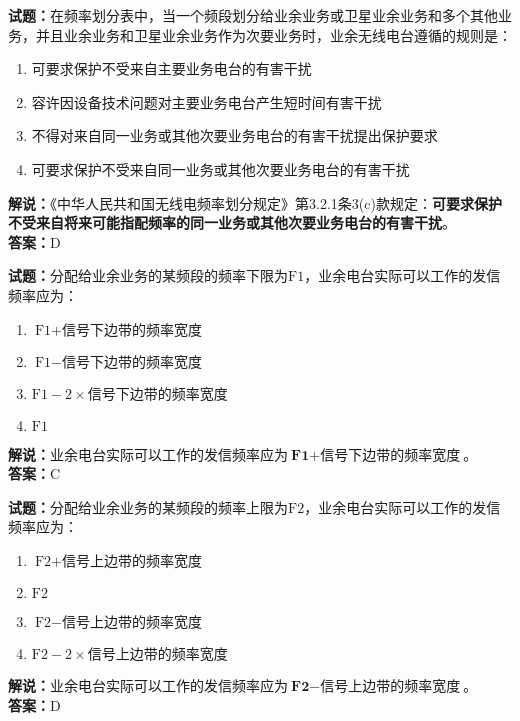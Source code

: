 \documentclass{ctexbook}
\begin{document}
\bigskip

\noindent\textbf{试题：}在频率划分表中，当一个频段划分给业余业务或卫星业余业务和多个其他业务，并且业余业务和卫星业余业务作为次要业务时，业余无线电台遵循的规则是：
\begin{enumerate}[leftmargin=3em]
  \item 可要求保护不受来自主要业务电台的有害干扰
  \item 容许因设备技术问题对主要业务电台产生短时间有害干扰
  \item 不得对来自同一业务或其他次要业务电台的有害干扰提出保护要求
  \item 可要求保护不受来自同一业务或其他次要业务电台的有害干扰
\end{enumerate}
\noindent\textbf{解说：}《中华人民共和国无线电频率划分规定》第3.2.1条3(c)款规定：\textbf{可要求保护不受来自将来可能指配频率的同一业务或其他次要业务电台的有害干扰}。\\\textbf{答案：}D

\bigskip

\noindent\textbf{试题：}分配给业余业务的某频段的频率下限为\(\textrm{F1}\)，业余电台实际可以工作的发信频率应为：
\begin{enumerate}[leftmargin=3em]
  \item \(\textrm{F1} + \textrm{信号下边带的频率宽度}\)
  \item \(\textrm{F1} - \textrm{信号下边带的频率宽度}\)
  \item \(\textrm{F1} - 2 \times \textrm{信号下边带的频率宽度}\)
  \item \(\textrm{F1}\)
\end{enumerate}
\noindent\textbf{解说：}业余电台实际可以工作的发信频率应为\(\textbf{F1} + \textbf{信号下边带的频率宽度}\)。
\\\noindent\textbf{答案：}C

\bigskip

\noindent\textbf{试题：}分配给业余业务的某频段的频率上限为\(\textrm{F2}\)，业余电台实际可以工作的发信频率应为：
\begin{enumerate}[leftmargin=3em]
  \item \(\textrm{F2} + \textrm{信号上边带的频率宽度}\)
  \item \(\textrm{F2}\)
  \item \(\textrm{F2} - \textrm{信号上边带的频率宽度}\)
  \item \(\textrm{F2} - 2 \times \textrm{信号上边带的频率宽度}\)
\end{enumerate}
\noindent\textbf{解说：}业余电台实际可以工作的发信频率应为\(\textbf{F2} - \textbf{信号上边带的频率宽度}\)。
\\\noindent\textbf{答案：}D
\end{document}

